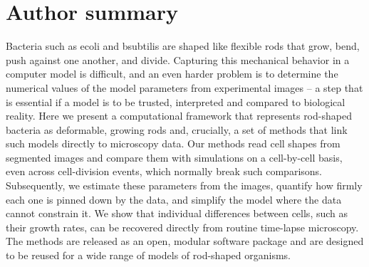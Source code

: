 \documentclass[10pt,letterpaper]{article}
\begin{document}
\section*{Author summary}
Bacteria such as \acl{ecoli} and \acl{bsubtilis} are shaped like flexible rods that grow, bend,
push against one another, and divide. Capturing this mechanical behavior in a computer model is
difficult, and an even harder problem is to determine the numerical values of the model parameters
from experimental images -- a step that is essential if a model is to be trusted, interpreted and
compared to biological reality. Here we present a computational framework that represents rod-shaped
bacteria as deformable, growing rods and, crucially, a set of methods that link such models
directly to microscopy data. Our methods read cell shapes from segmented images and compare them
with simulations on a cell-by-cell basis, even across cell-division events, which normally break
such comparisons.
Subsequently, we estimate these parameters from the images, quantify how firmly each one is pinned
down by the data, and simplify the model where the data cannot constrain it.
We show that individual differences between cells, such as their growth rates, can
be recovered directly from routine time-lapse microscopy. The methods are released as an open,
modular software package and are designed to be reused for a wide range of models of rod-shaped
organisms.

\linenumbers

\pagebreak
\end{document}
